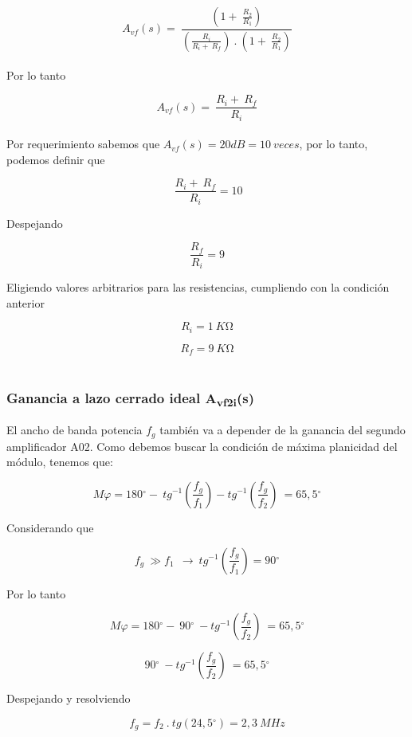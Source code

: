 \documentclass[12pt,a4paper]{article}
\begin{document}
\[A_{vf}(s) = \ \frac{\left( 1 + \ \frac{R_{2}}{R_{1}} \right)}{\left( \frac{R_{i}}{R_{i} + \ R_{f}} \right)\ .\ \left( 1 + \ \frac{R_{2}}{R_{1}} \right)}\] \\

Por lo tanto

\[A_{vf}(s) = \ \frac{R_{i} + \ R_{f}}{R_{i}}\] \\

Por requerimiento sabemos que \(A_{vf}(s) = 20dB = 10\ veces\), por lo
tanto, podemos definir que

\[\ \frac{R_{i} + \ R_{f}}{R_{i}} = 10\]

Despejando

\[\frac{R_{f}}{R_{i}} = 9\]

Eligiendo valores arbitrarios para las resistencias, cumpliendo con la
condición anterior

\[R_{i} = 1\ K\mathrm{\Omega}\]

\[R_{f} = 9\ K\mathrm{\Omega}\] \\

\subsubsection{\texorpdfstring{Ganancia a lazo cerrado ideal
A\textsubscript{vf2i}(s)}{Ganancia a lazo cerrado ideal Avf2i(s)}}\label{ganancia-a-lazo-cerrado-ideal-avf2is}

El ancho de banda potencia \(f_{g}\) también va a depender de la
ganancia del segundo amplificador A02. Como debemos buscar la condición
de máxima planicidad del módulo, tenemos que:

\[M\varphi = 180{^\circ} - \ {tg}^{- 1}\left( \frac{f_{g}}{f_{1}} \right) - {tg}^{- 1}\left( \frac{f_{g}}{f_{2}} \right)\  = 65,5{^\circ}\]

\newpage

Considerando que

\[f_{g}\  \gg f_{1}\ \  \rightarrow \ {tg}^{- 1}\left( \frac{f_{g}}{f_{1}} \right) = 90{^\circ}\]

Por lo tanto

\[M\varphi = 180{^\circ} - \ 90{^\circ}\  - {tg}^{- 1}\left( \frac{f_{g}}{f_{2}} \right)\  = 65,5{^\circ}\]

\[90{^\circ}\  - {tg}^{- 1}\left( \frac{f_{g}}{f_{2}} \right)\  = 65,5{^\circ}\]

Despejando y resolviendo

\[f_{g} = f_{2}\ .\ tg(24,5{^\circ}) = 2,3\ MHz\] \\
\end{document}
